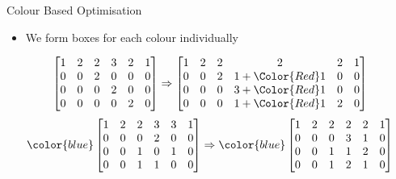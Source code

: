 \begin{frame}{Colour Based Optimisation}
	\begin{itemize}
		\item We form boxes for each colour individually
	\end{itemize}
	\begin{equation*}
     \begin{bmatrix}
     1&2&2&3&2&1\\
  0&0&2&0&0&0\\
  0&0&0&2&0&0\\
  0&0&0&0&2&0
         \end{bmatrix} \Rightarrow
     \begin{bmatrix}
     1&2&2&2&2&1\\
	     0&0&2&1+\Color{Red}1&0&0\\
	     0&0&0&3+\Color{Red}1&0&0\\
	     0&0&0&1+\Color{Red}1&2&0
     \end{bmatrix}
	\end{equation*}
	\begin{equation*}
    \color{blue}
    \begin{bmatrix}
        1&2&2&3&3&1\\
        0&0&0&2&0&0\\
        0&0&1&0&1&0\\
        0&0&1&1&0&0\\
    \end{bmatrix}\Rightarrow
    \color{blue}
    \begin{bmatrix}
        1&2&2&2&2&1\\
        0&0&0&3&1&0\\
        0&0&1&1&2&0\\
        0&0&1&2&1&0\\
    \end{bmatrix}
	\end{equation*}
\end{frame}
